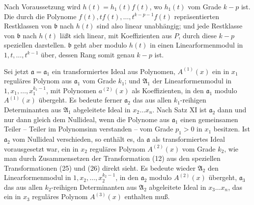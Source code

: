 \documentclass[11pt]{article}
\providecommand{\aideal}{\mathfrak a}
\providecommand{\bideal}{\mathfrak b}
\begin{document}
Nach Voraussetzung wird $h(t)=h_1(t)f(t)$, wo $h_1(t)$ vom Grade $k-p$ ist. Die durch die Polynome $f(t),tf(t),\ldots,t^{k-p-1}f(t)$ repräsentierten Restklassen von $\bideal$ nach $h(t)$ sind also linear unabhängig; und jede Restklasse von $\bideal$ nach $h(t)$ läßt sich linear, mit Koeffizienten aus $P$, durch diese $k-p$ speziellen darstellen. $\bideal$ geht aber modulo $h(t)$ in einen Linearformenmodul in $1,t,\ldots,t^{k-1}$ über, dessen Rang somit genau $k-p$ ist.

Sei jetzt $\aideal=\aideal_1$ ein transformiertes Ideal aus Polynomen, $A^{(1)}(x)$ ein in $x_1$ reguläres Polynom aus $\aideal_1$ vom Grade $k_1$; und $\mathfrak A_1$ der Linearformenmodul in $1,x_1,\ldots,x_1^{k_1-1}$, mit Polynomen $a^{(2)}(x)$ als Koeffizienten, in den $\aideal_1$ modulo $A^{(1)}(x)$ übergeht. Es bedeute ferner $\aideal_2$ das aus allen $k_1$-reihigen Determinanten aus $\mathfrak A_1$ abgeleitete Ideal in $x_2\ldots x_n$. Nach Satz XI ist $\aideal_2$ dann und nur dann gleich dem Nullideal, wenn die Polynome aus $\aideal_1$ einen gemeinsamen Teiler -- Teiler im Polynomsinn verstanden -- vom Grade $p_1>0$ in $x_1$ besitzen. Ist $\aideal_2$ vom Nullideal verschieden, so enthält es, da $\aideal$ als transformiertes Ideal vorausgesetzt war, ein in $x_2$ reguläres Polynom $A^{(2)}(x)$ vom Grade $k_2$, wie man durch Zusammensetzen der Transformation (12) aus den speziellen Transformationen (25) und (26) direkt sieht. Es bedeute wieder $\mathfrak A_2$ den Linearformenmodul in $1,x_2,\ldots,x_2^{k_2-1}$, in den $\aideal_2$ modulo $A^{(2)}(x)$ übergeht, $\aideal_3$ das aus allen $k_2$-reihigen Determinanten aus $\mathfrak A_2$ abgeleitete Ideal in $x_3\ldots x_n$, das ein in $x_3$ reguläres Polynom $A^{(3)}(x)$ enthalten muß.
\end{document}
